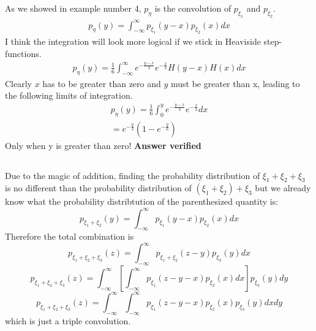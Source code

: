 \subsection{}
As we showed in example number 4, $p_{\eta}$ is the convolution of $p_{\xi_1}$ and $p_{\xi_2}$.
\begin{eqnarray}
	p_{\eta}(y) = \int_{-\infty}^{\infty} p_{\xi_1}(y-x)p_{\xi_2}(x)dx
\end{eqnarray}
I think the integration will look more logical if we stick in Heaviside step-functions.
\begin{eqnarray}
	p_{\eta}(y) = \frac{1}{6} \int_{-\infty}^{\infty}e^{-\frac{y-x}{3}}e^{-\frac{x}{3}}H(y-x)H(x)dx
\end{eqnarray}
Clearly $x$ has to be greater than zero and $y$ must be greater than x, leading to the following limits of integration.
\begin{eqnarray}
	p_{\eta}(y) = \frac{1}{6} \int_{0}^{y}e^{-\frac{y-x}{3}}e^{-\frac{x}{3}}dx \\
	= e^{-\frac{y}{3}}\left(1- e^{-\frac{y}{6}}  \right)
\end{eqnarray}
Only when y is greater than zero!
\textbf{Answer verified}

\subsection{}
Due to the magic of addition, finding the probability distribution of $\xi_1 + \xi_2 + \xi_3$ is no different than the probability distribution of $(\xi_1 + \xi_2) + \xi_3$ but we already know what the probability distribtution of the parenthesized quantity is:
\begin{equation}
	p_{\xi_1 + \xi_2}(y) = \int_{-\infty}^{\infty} p_{\xi_1}(y-x)p_{\xi_2}(x)dx
\end{equation}
Therefore the total combination is
\begin{equation}
	p_{\xi_1 + \xi_2+ \xi_3}(z) = \int_{-\infty}^{\infty} p_{\xi_1 + \xi_2}(z-y)p_{\xi_3}(y)dx
\end{equation}
\begin{equation}
	p_{\xi_1 + \xi_2+ \xi_3}(z) = \int_{-\infty}^{\infty} \left[ \int_{-\infty}^{\infty} p_{\xi_1}(z-y-x)p_{\xi_2}(x)dx \right]p_{\xi_3}(y)dy
\end{equation}
\begin{equation}
	p_{\xi_1 + \xi_2+ \xi_3}(z) = \int_{-\infty}^{\infty}  \int_{-\infty}^{\infty} p_{\xi_1}(z-y-x)p_{\xi_2}(x)p_{\xi_3}(y)dx dy
\end{equation}
which is just a triple convolution.


